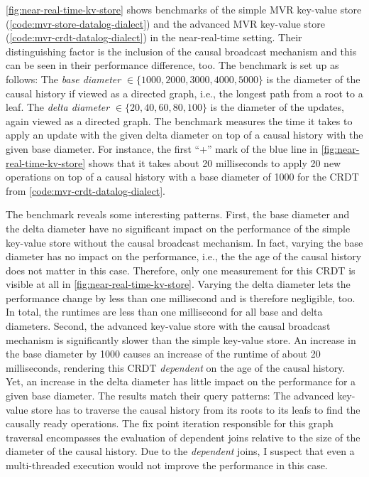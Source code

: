 \ref{fig:near-real-time-kv-store} shows benchmarks of the simple \ac{MVR} key-value
store (\ref{code:mvr-store-datalog-dialect}) and the advanced \ac{MVR} key-value
store (\ref{code:mvr-crdt-datalog-dialect}) in the near-real-time
setting.
Their distinguishing factor is the inclusion of the causal broadcast mechanism
and this can be seen in their performance difference, too.
The benchmark is set up as follows:
The \emph{base diameter} \(\in \{1000, 2000, 3000, 4000, 5000\}\) is the diameter
of the causal history if viewed as a directed graph,
i.e., the longest path from a root to a leaf.
The \emph{delta diameter} \(\in \{20, 40, 60, 80, 100\}\) is the diameter of the
updates, again viewed as a directed graph.
The benchmark measures the time it takes to apply an update with the given
delta diameter on top of a causal history with the given base diameter.
For instance, the first ``+'' mark of the blue line in
\ref{fig:near-real-time-kv-store} shows that it takes about 20 milliseconds
to apply 20 new operations on top of a causal history with a base diameter of
1000 for the CRDT from \ref{code:mvr-crdt-datalog-dialect}.

The benchmark reveals some interesting patterns.
First, the base diameter and the delta diameter have no significant impact
on the performance of the simple key-value store without the causal broadcast
mechanism.
In fact, varying the base diameter has no impact on the performance, i.e.,
the the age of the causal history does not matter in this case.
Therefore, only one measurement for this \ac{CRDT} is visible at all
in \ref{fig:near-real-time-kv-store}.
Varying the delta diameter lets the performance change by less than one millisecond
and is therefore negligible, too.
In total, the runtimes are less than one millisecond for all base and delta diameters.
Second, the advanced key-value store with the causal broadcast mechanism
is significantly slower than the simple key-value store.
An increase in the base diameter by 1000 causes an increase of the runtime of
about 20 milliseconds, rendering this \ac{CRDT} \emph{dependent} on the age
of the causal history.
Yet, an increase in the delta diameter has little impact on the performance
for a given base diameter.
The results match their query patterns:
The advanced key-value store has to traverse the causal history from its
roots to its leafs to find the causally ready operations.
The fix point iteration responsible for this graph traversal encompasses the
evaluation of dependent joins relative to the size of the diameter of the causal
history.
Due to the \emph{dependent} joins, I suspect that even a multi-threaded execution
would not improve the performance in this case.

